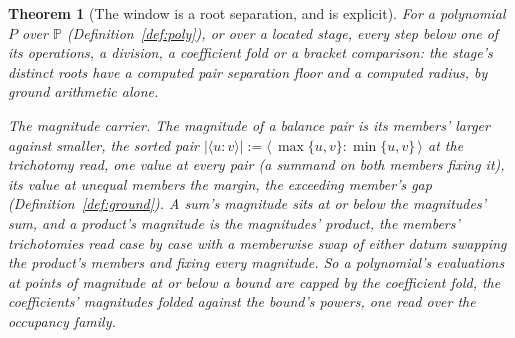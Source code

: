 \documentclass[11pt]{article}
\newtheorem{theorem}{Theorem}
\theoremstyle{definition}
\begin{document}
\begin{theorem}[The window is a root separation, and is explicit]
\label{thm:windowsep}
For a polynomial $P$ over $\mathbb P$ (Definition~\ref{def:poly}), or
over a located stage, every step below one of its operations, a
division, a coefficient fold or a bracket comparison: the stage's
distinct roots have a computed pair separation floor and a computed radius,
by ground arithmetic alone.

\emph{The magnitude carrier.} The \emph{magnitude} of a
balance pair is its members' larger against smaller, the sorted pair
$|\langle u\!:\!v\rangle|:=
\langle\,\max\{u,v\}\!:\!\min\{u,v\}\,\rangle$ at the trichotomy
read, one value at every pair (a summand on both members fixing
it), its value at unequal members the margin, the exceeding
member's gap (Definition~\ref{def:ground}). A sum's magnitude
sits at or below the magnitudes' sum, and a product's magnitude is
the magnitudes' product, the members' trichotomies read case by
case with a memberwise swap of either datum swapping the product's
members and fixing every magnitude. So a polynomial's evaluations
at points of magnitude at or below a bound are capped by the
\emph{coefficient fold}, the coefficients' magnitudes folded
against the bound's powers, one read over the occupancy family.


\end{theorem}
\end{document}
